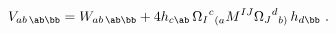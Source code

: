 \begin{equation} \label{V-W}
  V_{ab\,\ab\bb} = W_{ab\,\ab\bb} + 4 h_{c\ab}\, {\Omega_I}^c{}_{(a}
  M^{IJ} {\Omega_J}^d{}_{b)}\, h_{d\bb}\ .
 \end{equation}

